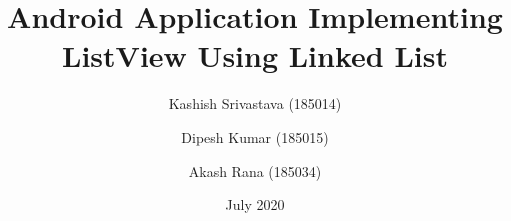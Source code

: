 \documentclass[11pt,a4paper]{report}
\begin{document}
    
\renewcommand\bibname{References}

\titleformat{\chapter}{\bfseries\huge\centering}{}{0pt}{}{\huge}
\titlespacing*{\chapter}{0pt}{-60pt}{40pt}
\setlength{\parindent}{2em}
\setlength{\parskip}{1em}

\newenvironment{myindentpar}[1]%
  {\begin{list}{}%
          {\setlength{\leftmargin}{#1}}%
          \item[]%
  }
  {\end{list}}

\title{Android Application Implementing ListView Using Linked List}

\author{Kashish Srivastava (185014)\\
        \and 
        Dipesh Kumar (185015)\\
        \and
        Akash Rana (185034)
}

\date{July 2020}



\pagestyle{plain}
\end{document}
